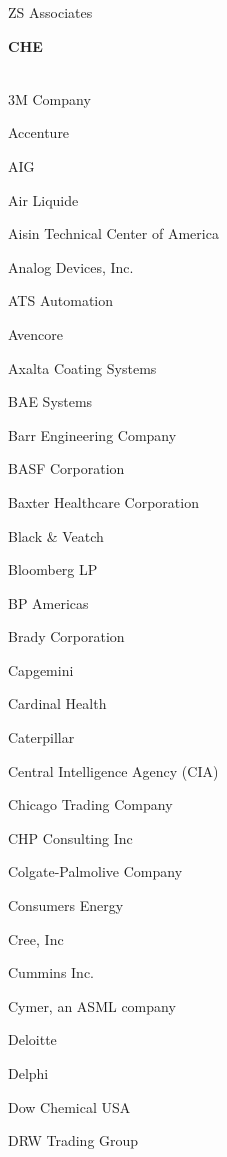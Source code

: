\documentclass[twoside]{article}
\begin{document}
\begin{center}
\begin{multicols}{5}
\begin{FlushLeft}
\begin{compactitem}
\item ZS Associates
\end{compactitem}
        \end{FlushLeft}
        \vspace{1em}
        {\fontsize{14}{16}\selectfont \bf CHE}\\
        \vspace{-1em}
        ~\hrulefill~
        \vspace{-.9em}
        \begin{FlushLeft}
        \begin{compactitem}
        \item 3M Company
\item Accenture
\item AIG
\item Air Liquide
\item Aisin Technical Center of America
\item Analog Devices, Inc.
\item ATS Automation
\item Avencore
\item Axalta Coating Systems
\item BAE Systems
\item Barr Engineering Company
\item BASF Corporation
\item Baxter Healthcare Corporation
\item Black \& Veatch
\item Bloomberg LP
\item BP Americas
\item Brady Corporation
\item Capgemini
\item Cardinal Health
\item Caterpillar
\item Central Intelligence Agency (CIA)
\item Chicago Trading Company
\item CHP Consulting Inc
\item Colgate-Palmolive Company
\item Consumers Energy
\item Cree, Inc
\item Cummins Inc.
\item Cymer, an ASML company
\item Deloitte
\item Delphi
\item Dow Chemical USA
\item DRW Trading Group

\end{compactitem}
\end{FlushLeft}
\end{multicols}
\end{center}
\end{document}
